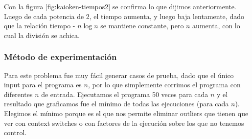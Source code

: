 Con la figura \ref{fig:kaioken-tiempos2} se confirma lo que dijimos anteriormente. Luego de cada potencia de 2, el tiempo aumenta, y luego baja lentamente, dado que la relación tiempo - $n \log n$ se mantiene constante, pero $n$ aumenta, con lo cual la división se achica.


\subsubsection{M\'etodo de experimentación}

Para este problema fue muy fácil generar casos de prueba, dado que el único input para el programa es $n$, por lo que simplemente corrimos el programa con diferentes $n$ de entrada. Ejecutamos el programa 50 veces para cada $n$ y el resultado que graficamos fue el mínimo de todas las ejecuciones (para cada $n$). Elegimos el mínimo porque es el que nos permite eliminar outliers que tienen que ver con context switches o con factores de la ejecución sobre los que no tenemos control.


